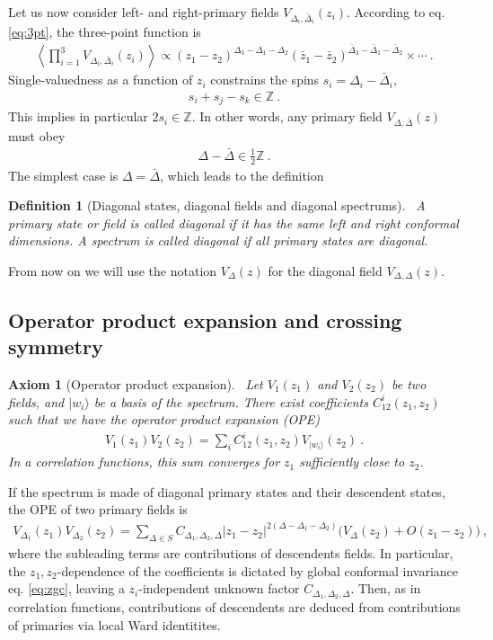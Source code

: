 \documentclass[12pt, a4paper]{article}
\theoremstyle{break}
\newtheorem{hyp}[exo]{Axiom}
\newtheorem{defn}[exo]{Definition}
\begin{document}
Let us now consider left- and right-primary fields $V_{\Delta_i,\bar\Delta_i}(z_i)$. According to eq. \eqref{eq:3pt}, the three-point function is 
\begin{align}
 \left<\prod_{i=1}^3V_{\Delta_i,\bar\Delta_i}(z_i) \right> \propto (z_1-z_2)^{\Delta_3-\Delta_1-\Delta_2} (\bar z_1-\bar z_2)^{\bar\Delta_3-\bar\Delta_1-\bar\Delta_2} \times \cdots\ .
\end{align}
Single-valuedness as a function of $z_i$ constrains the spins $s_i=\Delta_i-\bar\Delta_i$, 
\begin{align}
 s_i+s_j-s_k \in \mathbb{Z}\ .
\end{align}
This implies in particular $2s_i\in\mathbb{Z}$. In other words, any primary field $V_{\Delta,\bar\Delta}(z)$ must obey
\begin{align}
 \Delta -\bar \Delta \in \frac12\mathbb{Z}\ .
\end{align} 
The simplest case is $\Delta=\bar\Delta$, which leads to the definition

\begin{defn}[Diagonal states, diagonal fields and diagonal spectrums]
 ~\label{def:diag}
 A primary state or field is called diagonal if it has the same left and right conformal dimensions. A spectrum is called diagonal if all primary states are diagonal.
\end{defn}
From now on we will use the notation $V_\Delta(z)$ for the diagonal field $V_{\Delta,\Delta}(z)$.

\subsection{Operator product expansion and crossing symmetry}

\begin{hyp}[Operator product expansion]
 ~\label{hyp:ope}
 Let $V_1(z_1)$ and $V_2(z_2)$ be two fields, and $|w_i\rangle$ be a basis of the spectrum.
 There exist coefficients $C^i_{12}(z_1,z_2)$ such that we have the operator product expansion (OPE) 
 \begin{align}
  V_1(z_1)V_2(z_2) = \sum_i C^i_{12}(z_1,z_2) V_{|w_i\rangle}(z_2)\ .
 \end{align}
 In a correlation functions,
 this sum converges for $z_1$ sufficiently close to $z_2$.
\end{hyp}
If the spectrum is made of diagonal primary states and their descendent states, the OPE of two primary fields is
\begin{align}
 V_{\Delta_1}(z_1) V_{\Delta_2}(z_2) 
 = \sum_{\Delta\in S} C_{\Delta_1,\Delta_2,\Delta} |z_1-z_2|^{2(\Delta-\Delta_1-\Delta_2)}
 \Big(V_{\Delta}(z_2) + O(z_1-z_2) \Big)\ ,
 \label{eq:ope}
\end{align}
where the subleading terms are contributions of descendents fields. 
In particular, the $z_1,z_2$-dependence of the coefficients is dictated by global conformal invariance eq. \eqref{eq:zgc}, leaving a $z_i$-independent unknown factor $C_{\Delta_1,\Delta_2,\Delta}$.
Then, as in correlation functions, contributions of descendents are deduced from contributions of primaries via local Ward identitites.
\end{document}
